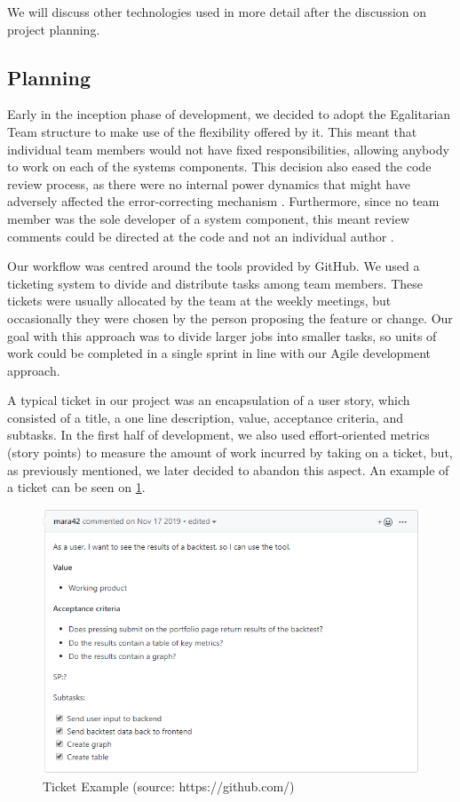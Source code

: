\documentclass[main.tex]{subfiles}
\begin{document}
We will discuss other technologies used in more detail after the discussion on project planning.

\subsection{Planning}

Early in the inception phase of development, we decided to adopt the Egalitarian Team structure to make use of the flexibility offered by it. This meant that individual team members would not have fixed responsibilities, allowing anybody to work on each of the systems components. This decision also eased the code review process, as there were no internal power dynamics that might have adversely affected the error-correcting mechanism \cite{statusdifference}. Furthermore, since no team member was the sole developer of a system component, this meant review comments could be directed at the code and not an individual author \cite{howtoreview}. 

Our workflow was centred around the tools provided by GitHub. We used a ticketing system to divide and distribute tasks among team members. These tickets were usually allocated by the team at the weekly meetings, but occasionally they were chosen by the person proposing the feature or change. Our goal with this approach was to divide larger jobs into smaller tasks, so units of work could be completed in a single sprint in line with our Agile development approach.

A typical ticket in our project was an encapsulation of a user story, which consisted of a title, a one line description, value, acceptance criteria, and subtasks. In the first half of development, we also used effort-oriented metrics (story points) to measure the amount of work incurred by taking on a ticket, but, as previously mentioned, we later decided to abandon this aspect. An example of a ticket can be seen on \figurename{\ref{Ticket}}.

\begin{figure}[H]
   \centering
   \includegraphics[scale=0.7]{05Coding/05Pictures/ticket.png}
   \caption{Ticket Example (source: https://github.com/)}
   \label{Ticket}
\end{figure}
\end{document}
